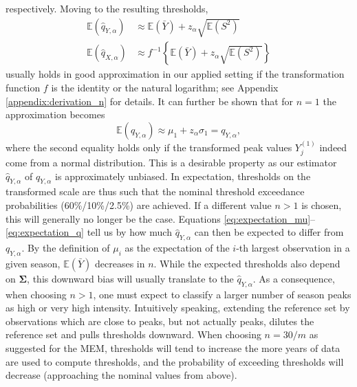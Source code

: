 \documentclass{article}
\begin{document}
respectively. Moving to the resulting thresholds,
\begin{align}
\mathbb{E}(\hat{q}_{Y, \alpha}) & \approx \mathbb{E}(\bar{Y}) + z_\alpha \sqrt{\mathbb{E}(S^2)}
\label{eq:expectation_q}\\
\mathbb{E}(\hat{q}_{X, \alpha}) & \approx f^{-1}\left\{\mathbb{E}(\bar{Y}) + z_\alpha \sqrt{\mathbb{E}(S^2)}\right\}
\label{eq:expectation_q2}
\end{align}
usually holds in good approximation in our applied setting if the transformation function $f$ is the identity or the natural logarithm; see Appendix \ref{appendix:derivation_n} for details. It can further be shown that for $n = 1$ the approximation becomes
$$
\mathbb{E}(\hat{q}_{Y, \alpha}) \approx \mu_1 + z_\alpha \sigma_1 = q_{Y, \alpha},
$$
where the second equality holds only if the transformed peak values $Y_{j}^{(1)}$ indeed come from a normal distribution.  This is a desirable property as our estimator $\hat{q}_{Y, \alpha}$ of $q_{Y, \alpha}$ is approximately unbiased. In expectation, thresholds on the transformed scale are thus such that the nominal threshold exceedance probabilities (60\%/10\%/2.5\%) are achieved. If a different value $n > 1$ is chosen, this will generally no longer be the case. Equations \eqref{eq:expectation_mu}--\eqref{eq:expectation_q} tell us by how much $\hat{q}_{Y, \alpha}$ can then be expected to differ from $q_{Y, \alpha}$. By the definition of $\mu_i$ as the expectation of the $i$-th largest observation in a given season, $\mathbb{E}(\bar{Y})$ decreases in $n$. While the expected thresholds also depend on $\mathbf{\Sigma}$, this downward bias will usually translate to the $\hat{q}_{Y, \alpha}$. As a consequence, when choosing $n > 1$, one must expect to classify a larger number of season peaks as high or very high intensity. Intuitively speaking, extending the reference set by observations which are close to peaks, but not actually peaks, dilutes the reference set and pulls thresholds downward. When choosing $n = 30/m$ as suggested for the MEM, thresholds will tend to increase the more years of data are used to compute thresholds, and the probability of exceeding thresholds will decrease (approaching the nominal values from above). 

\end{document}
